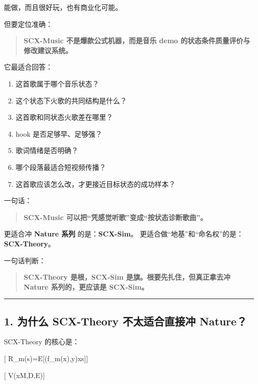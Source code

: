 \documentclass[
  12pt,
]{ctexart}
\providecommand{\tightlist}{%
  \setlength{\itemsep}{0pt}\setlength{\parskip}{0pt}}
\begin{document}
能做，而且很好玩，也有商业化可能。

但要定位准确：

\begin{quote}
\textbf{SCX-Music 不是爆款公式机器，而是音乐 demo
的状态条件质量评价与修改建议系统。}
\end{quote}

它最适合回答：

\begin{enumerate}
\def\labelenumi{\arabic{enumi}.}
\tightlist
\item
  这首歌属于哪个音乐状态？
\item
  这个状态下火歌的共同结构是什么？
\item
  这首歌和同状态火歌差在哪里？
\item
  hook 是否足够早、足够强？
\item
  歌词情绪是否明确？
\item
  哪个段落最适合短视频传播？
\item
  这首歌应该怎么改，才更接近目标状态的成功样本？
\end{enumerate}

一句话：

\begin{quote}
\textbf{SCX-Music 可以把``凭感觉听歌''变成``按状态诊断歌曲''。}
\end{quote}

更适合冲 \textbf{Nature 系列} 的是：\textbf{SCX-Sim}。
更适合做``地基''和``命名权''的是：\textbf{SCX-Theory}。

一句话判断：

\begin{quote}
\textbf{SCX-Theory 是根，SCX-Sim 是旗。根要先扎住，但真正拿去冲 Nature
系列的，更应该是 SCX-Sim。}
\end{quote}

\begin{center}\rule{0.5\linewidth}{0.5pt}\end{center}

\subsection{1. 为什么 SCX-Theory 不太适合直接冲
Nature？}\label{ux4e3aux4ec0ux4e48-scx-theory-ux4e0dux592aux9002ux5408ux76f4ux63a5ux51b2-nature}

SCX-Theory 的核心是：

{[} R\_m(s)=\mathbb E{[}\ell(f\_m(x),y)\mid x\in s{]}{]}

{[} V(x\mid \mathcal M,\mathcal D,\mathcal E){]}
\end{document}
